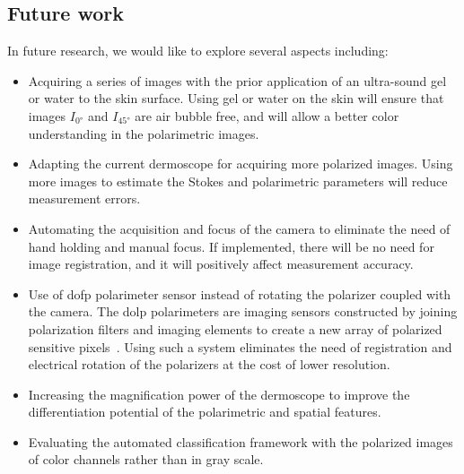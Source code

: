 \subsection{Future work}
In future research, we would like to explore several aspects including: 
\begin{itemize}
\item Acquiring a series of images with the prior application of an ultra-sound gel or water to the skin surface.
Using gel or water on the skin will ensure that images $I_{\ang{0}}$ and $I_{\ang{45}}$ are air bubble free, and will allow a better color understanding in the polarimetric images.
\item Adapting the current dermoscope for acquiring more polarized images.
Using more images to estimate the Stokes and polarimetric parameters will reduce measurement errors.
\item Automating the acquisition and focus of the camera to eliminate the need of hand holding and manual focus.
If implemented, there will be no need for image registration, and it will positively affect measurement accuracy.
\item Use of \ac{dofp} polarimeter sensor instead of rotating the polarizer coupled with the camera.
The \ac{dolp} polarimeters are imaging sensors constructed by joining polarization filters and imaging elements to create a new array of polarized sensitive pixels~\cite{powell2013calibrationpolarimeters}.
Using such a system eliminates the need of registration and electrical rotation of the polarizers at the cost of lower resolution.
\item Increasing the magnification power of the dermoscope to improve the differentiation potential of the polarimetric and spatial features. 
\item Evaluating the automated classification framework with the polarized images of color channels rather than in gray scale.
\end{itemize}


